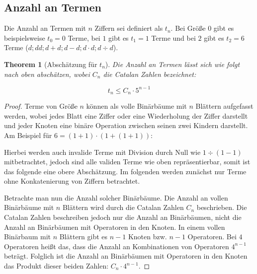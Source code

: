 \documentclass{article}
\newtheorem{theorem}{Theorem}[section]
\theoremstyle{nonumberplain}
\newtheorem{proof}{Beweis}
\begin{document}
\subsection{Anzahl an Termen}

Die Anzahl an Termen mit \(n\) Ziffern sei definiert als \(t_n\).
Bei Größe \(0\) gibt es beispielsweise \(t_0 = 0\) Terme, bei \(1\) gibt es \(t_1 = 1\) Terme und bei \(2\) gibt es \(t_2 = 6\) Terme (\(d; dd; d+d; d-d; d \cdot d; d \div d\)).

\begin{theorem}[Abschätzung für \(t_n\)]\label{theorem:tn_bound}
    Die Anzahl an Termen lässt sich wie folgt nach oben abschätzen, wobei \(C_n\) die Catalan Zahlen bezeichnet:

    \[t_n \leq C_n \cdot 5^{n-1}\]
\end{theorem}
\begin{proof}
    Terme von Größe \(n\) können als volle Binärbäume mit \(n\) Blättern aufgefasst werden, wobei jedes Blatt eine Ziffer oder eine Wiederholung der Ziffer darstellt und jeder Knoten eine binäre Operation zwischen seinen zwei Kindern darstellt.
    Am Beispiel für \(6 = (1+1)\cdot(1+(1+1))\):
    \begin{center}
    \end{center}
    Hierbei werden auch invalide Terme mit Division durch Null wie \(1 \div (1-1)\) mitbetrachtet, jedoch sind alle validen Terme wie oben repräsentierbar, somit ist das folgende eine obere Abschätzung.
    Im folgenden werden zunächst nur Terme ohne Konkatenierung von Ziffern betrachtet.

    Betrachte man nun die Anzahl solcher Binärbäume.
    Die Anzahl an vollen Binärbäume mit \(n\) Blättern wird durch die Catalan Zahlen \(C_n\) beschrieben.
    Die Catalan Zahlen beschreiben jedoch nur die Anzahl an Binärbäumen, nicht die Anzahl an Binärbäumen mit Operatoren in den Knoten.
    In einem vollen Binärbaum mit \(n\) Blättern gibt es \(n-1\) Knoten bzw. \(n-1\) Operatoren.
    Bei \(4\) Operatoren heißt das, dass die Anzahl an Kombinationen von Operatoren \(4^{n-1}\) beträgt.
    Folglich ist die Anzahl an Binärbäumen mit Operatoren in den Knoten das Produkt dieser beiden Zahlen: \(C_n \cdot 4^{n-1}\).


\end{proof}
\end{document}
